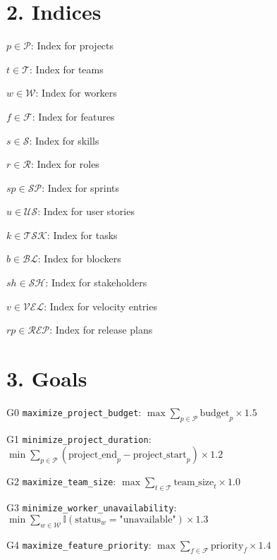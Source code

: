 \documentclass[12pt]{article}
\begin{document}
\section{2. Indices}
\item $p \in \mathcal{P}$: Index for projects
    \item $t \in \mathcal{T}$: Index for teams
    \item $w \in \mathcal{W}$: Index for workers
    \item $f \in \mathcal{F}$: Index for features
    \item $s \in \mathcal{S}$: Index for skills
    \item $r \in \mathcal{R}$: Index for roles
    \item $sp \in \mathcal{SP}$: Index for sprints
    \item $u \in \mathcal{US}$: Index for user stories
    \item $k \in \mathcal{TSK}$: Index for tasks
    \item $b \in \mathcal{BL}$: Index for blockers
    \item $sh \in \mathcal{SH}$: Index for stakeholders
    \item $v \in \mathcal{VEL}$: Index for velocity entries
    \item $rp \in \mathcal{REP}$: Index for release plans

\section{3. Goals}
\item[G0] \texttt{maximize\_project\_budget}: 
    $\max \sum_{p \in \mathcal{P}} \text{budget}_p \times 1.5$
    
    \item[G1] \texttt{minimize\_project\_duration}: 
    $\min \sum_{p \in \mathcal{P}} (\text{project\_end}_p - \text{project\_start}_p) \times 1.2$
    
    \item[G2] \texttt{maximize\_team\_size}: 
    $\max \sum_{t \in \mathcal{T}} \text{team\_size}_t \times 1.0$
    
    \item[G3] \texttt{minimize\_worker\_unavailability}: 
    $\min \sum_{w \in \mathcal{W}} \mathbb{I}(\text{status}_w = \text{"unavailable"}) \times 1.3$
    
    \item[G4] \texttt{maximize\_feature\_priority}: 
    $\max \sum_{f \in \mathcal{F}} \text{priority}_f \times 1.4$
    
\end{document}
